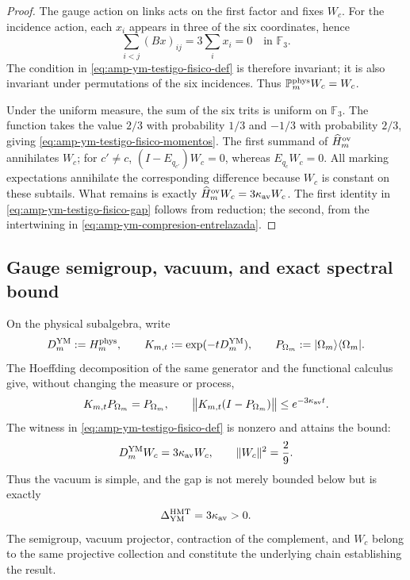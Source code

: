 \begin{proof}
The gauge action on links acts on the first factor and fixes
\(W_c\). For the incidence action, each \(x_i\) appears in three of the
six coordinates, hence
\[
 \sum_{i<j}(Bx)_{ij}=3\sum_i x_i=0
 \quad\text{in }\mathbb F_3.
\]
The condition in \eqref{eq:amp-ym-testigo-fisico-def} is therefore
invariant; it is also invariant under permutations of the six incidences.
Thus \(\mathbb P_m^{\rm phys}W_c=W_c\).

Under the uniform measure, the sum of the six trits is uniform on
\(\mathbb F_3\). The function takes the value \(2/3\) with probability \(1/3\)
and \(-1/3\) with probability \(2/3\), giving
\eqref{eq:amp-ym-testigo-fisico-momentos}. The first summand of
\(\widehat H_m^{\rm ov}\) annihilates \(W_c\); for \(c'\ne c\),
\((I-E_{q_{c'}})W_c=0\), whereas
\(E_{q_c}W_c=0\). All marking expectations annihilate the
corresponding difference because \(W_c\) is constant on these subtails.
What remains is exactly
\(\widehat H_m^{\rm ov}W_c=3\kappa_{\rm av}W_c\). The first identity in
\eqref{eq:amp-ym-testigo-fisico-gap} follows from reduction; the second,
from the intertwining in \eqref{eq:amp-ym-compresion-entrelazada}.
\end{proof}

\subsection*{Gauge semigroup, vacuum, and exact spectral bound}

On the physical subalgebra, write
\[
 D_m^{\rm YM}:=H_m^{\rm phys},\qquad
 K_{m,t}:=\exp(-tD_m^{\rm YM}),\qquad
 P_{\Omega_m}:=|\Omega_m\rangle\langle\Omega_m|.
\]
The Hoeffding decomposition of the same generator and the functional calculus
give, without changing the measure or process,
\begin{equation}\label{eq:amp-ym-owner-semigrupo-vacio}
 K_{m,t}P_{\Omega_m}=P_{\Omega_m},
 \qquad
 \bigl\|K_{m,t}(I-P_{\Omega_m})\bigr\|
 \leq e^{-3\kappa_{\rm av}t}.
\end{equation}
The witness in \eqref{eq:amp-ym-testigo-fisico-def} is nonzero and attains the
bound:
\begin{equation}\label{eq:amp-ym-owner-testigo-wc}
 D_m^{\rm YM}W_c=3\kappa_{\rm av}W_c,
 \qquad \|W_c\|^2=\frac29.
\end{equation}
Thus the vacuum is simple, and the gap is not merely bounded below
but is exactly
\begin{equation}\label{eq:amp-ym-owner-brecha-exacta}
 \Delta_{\rm YM}^{\rm HMT}=3\kappa_{\rm av}>0.
\end{equation}
The semigroup, vacuum projector, contraction of the complement, and
\(W_c\) belong to the same projective collection and constitute the underlying
chain establishing the result.


